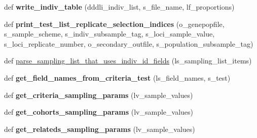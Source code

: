 \begin{DoxyCompactItemize}
\item 
def {\bfseries write\+\_\+indiv\+\_\+table} (dddli\+\_\+indiv\+\_\+list, s\+\_\+file\+\_\+name, lf\+\_\+proportions)\hypertarget{namespacenegui_1_1pgdriveneestimator_aafa226c9f86340bb646ac850410d315c}{}\label{namespacenegui_1_1pgdriveneestimator_aafa226c9f86340bb646ac850410d315c}

\item 
def {\bfseries print\+\_\+test\+\_\+list\+\_\+replicate\+\_\+selection\+\_\+indices} (o\+\_\+genepopfile, s\+\_\+sample\+\_\+scheme, s\+\_\+indiv\+\_\+subsample\+\_\+tag, s\+\_\+loci\+\_\+sample\+\_\+value, s\+\_\+loci\+\_\+replicate\+\_\+number, o\+\_\+secondary\+\_\+outfile, s\+\_\+population\+\_\+subsample\+\_\+tag)\hypertarget{namespacenegui_1_1pgdriveneestimator_aca2a38687a7be2fe6826a2e6c48d320f}{}\label{namespacenegui_1_1pgdriveneestimator_aca2a38687a7be2fe6826a2e6c48d320f}

\item 
def \hyperlink{namespacenegui_1_1pgdriveneestimator_a367b16a89c7ae46ab0bda5b37e68d9af}{parse\+\_\+sampling\+\_\+list\+\_\+that\+\_\+uses\+\_\+indiv\+\_\+id\+\_\+fields} (ls\+\_\+sampling\+\_\+list\+\_\+items)
\item 
def {\bfseries get\+\_\+field\+\_\+names\+\_\+from\+\_\+criteria\+\_\+test} (ls\+\_\+field\+\_\+names, s\+\_\+test)\hypertarget{namespacenegui_1_1pgdriveneestimator_a37d1a0b6a3f2554bf105a44578083490}{}\label{namespacenegui_1_1pgdriveneestimator_a37d1a0b6a3f2554bf105a44578083490}

\item 
def {\bfseries get\+\_\+criteria\+\_\+sampling\+\_\+params} (lv\+\_\+sample\+\_\+values)\hypertarget{namespacenegui_1_1pgdriveneestimator_af360c7e217a3b975a58fcd93b11fcdd3}{}\label{namespacenegui_1_1pgdriveneestimator_af360c7e217a3b975a58fcd93b11fcdd3}

\item 
def {\bfseries get\+\_\+cohorts\+\_\+sampling\+\_\+params} (lv\+\_\+sample\+\_\+values)\hypertarget{namespacenegui_1_1pgdriveneestimator_a6539e2249f040ddf8ce8a80fc778ec85}{}\label{namespacenegui_1_1pgdriveneestimator_a6539e2249f040ddf8ce8a80fc778ec85}

\item 
def {\bfseries get\+\_\+relateds\+\_\+sampling\+\_\+params} (lv\+\_\+sample\+\_\+values)\hypertarget{namespacenegui_1_1pgdriveneestimator_af7a5417c7b36ee09c02ae3e0526f6999}{}\label{namespacenegui_1_1pgdriveneestimator_af7a5417c7b36ee09c02ae3e0526f6999}


\end{DoxyCompactItemize}
